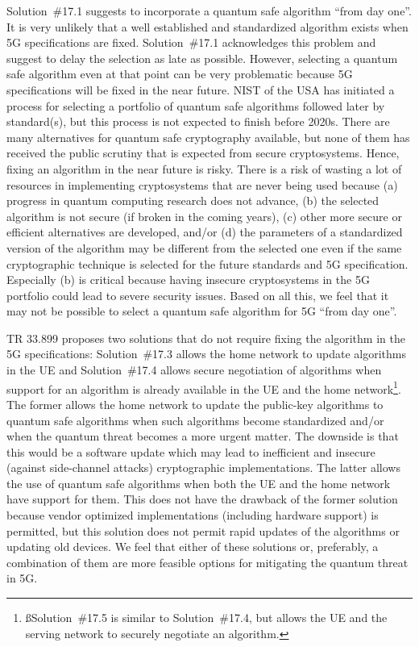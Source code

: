 \documentclass[12pt]{llncs}
\begin{document}
Solution~\#17.1 suggests to incorporate a quantum safe algorithm ``from day one''. It is very unlikely that a well established and standardized algorithm exists when 5G specifications are fixed. Solution~\#17.1 acknowledges this problem and suggest to delay the selection as late as possible. However, selecting a quantum safe algorithm even at that point can be very problematic because 5G specifications will be fixed in the near future. NIST of the USA has initiated a process for selecting a portfolio of quantum safe algorithms followed later by standard(s), but this process is not expected to finish before 2020s. There are many alternatives for quantum safe cryptography available, but none of them has received the public scrutiny that is expected from secure cryptosystems. Hence, fixing an algorithm in the near future is risky. There is a risk of wasting a lot of resources in implementing cryptosystems that are never being used because (a) progress in quantum computing research does not advance, (b) the selected algorithm is not secure (if broken in the coming years), (c) other more secure or efficient alternatives are developed, and/or (d) the parameters of a standardized version of the algorithm may be different from the selected one even if the same cryptographic technique is selected for the future standards and 5G specification. Especially (b) is critical because having insecure cryptosystems in the 5G portfolio could lead to severe security issues. Based on all this, we feel that it may not be possible to select a quantum safe algorithm for 5G ``from day one''.

TR 33.899 proposes two solutions that do not require fixing the algorithm in the 5G specifications: Solution~\#17.3 allows the home network to update algorithms in the UE and Solution~\#17.4 allows secure negotiation of algorithms when support for an algorithm is already available in the UE and the home network\footnote{ßSolution~\#17.5 is similar to Solution~\#17.4, but allows the UE and the serving network to securely negotiate an algorithm.}. The former allows the home network to update the public-key algorithms to quantum safe algorithms when such algorithms become standardized and/or when the quantum threat becomes a more urgent matter. The downside is that this would be a software update which may lead to inefficient and insecure (against side-channel attacks) cryptographic implementations. The latter allows the use of quantum safe algorithms when both the UE and the home network have support for them. This does not have the drawback of the former solution because vendor optimized implementations (including hardware support) is permitted, but this solution does not permit rapid updates of the algorithms or updating old devices. We feel that either of these solutions or, preferably, a combination of them are more feasible options for mitigating the quantum threat in 5G.
\end{document}
